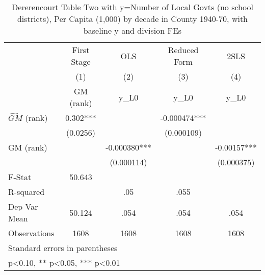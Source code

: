 \begin{table}[htbp]\centering
\def\sym#1{\ifmmode^{#1}\else\(^{#1}\)\fi}
\caption{Dererencourt Table Two with y=Number of Local Govts (no school districts), Per Capita (1,000) by decade in County 1940-70, with baseline y and division FEs}
\begin{tabular}{l*{4}{c}}
\toprule
                    & First Stage   &         OLS   &Reduced Form   &        2SLS   \\
                    &\multicolumn{1}{c}{(1)}&\multicolumn{1}{c}{(2)}&\multicolumn{1}{c}{(3)}&\multicolumn{1}{c}{(4)}\\
                    &\multicolumn{1}{c}{GM  (rank)}&\multicolumn{1}{c}{y\_L0}&\multicolumn{1}{c}{y\_L0}&\multicolumn{1}{c}{y\_L0}\\
\midrule
$\hat{GM}$ (rank)   &       0.302***&               &   -0.000474***&               \\
                    &    (0.0256)   &               &  (0.000109)   &               \\
\addlinespace
GM  (rank)          &               &   -0.000380***&               &    -0.00157***\\
                    &               &  (0.000114)   &               &  (0.000375)   \\
\midrule
F-Stat              &      50.643   &               &               &               \\
R-squared           &               &         .05   &        .055   &               \\
Dep Var Mean        &      50.124   &        .054   &        .054   &        .054   \\
Observations        &        1608   &        1608   &        1608   &        1608   \\
\bottomrule
\multicolumn{5}{l}{\footnotesize Standard errors in parentheses}\\
\multicolumn{5}{l}{\footnotesize * p<0.10, ** p<0.05, *** p<0.01}\\
\end{tabular}
\end{table}
